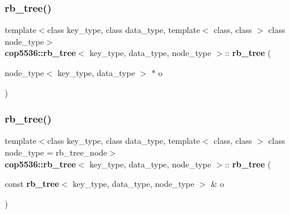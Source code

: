 \mbox{\label{classcop5536_1_1rb__tree_a83cacee524e3d572a88bfc096e32b59d}} 
\subsubsection{rb\_tree()\hspace{0.1cm}{\footnotesize\ttfamily [2/3]}}
{\footnotesize\ttfamily template$<$class key\+\_\+type, class data\+\_\+type, template$<$ class, class $>$ class node\+\_\+type$>$ \\
\textbf{ cop5536\+::rb\+\_\+tree}$<$ key\+\_\+type, data\+\_\+type, node\+\_\+type $>$\+::\textbf{ rb\+\_\+tree} (\begin{DoxyParamCaption}\item[{node\+\_\+type$<$ key\+\_\+type, data\+\_\+type $>$ $\ast$}]{o }\end{DoxyParamCaption})\hspace{0.3cm}{\ttfamily [explicit]}}

\mbox{\label{classcop5536_1_1rb__tree_a35e4d3f5788351f4d7d4086bfb8f31d2}} 
\subsubsection{rb\_tree()\hspace{0.1cm}{\footnotesize\ttfamily [3/3]}}
{\footnotesize\ttfamily template$<$class key\+\_\+type, class data\+\_\+type, template$<$ class, class $>$ class node\+\_\+type = rb\+\_\+tree\+\_\+node$>$ \\
\textbf{ cop5536\+::rb\+\_\+tree}$<$ key\+\_\+type, data\+\_\+type, node\+\_\+type $>$\+::\textbf{ rb\+\_\+tree} (\begin{DoxyParamCaption}\item[{const \textbf{ rb\+\_\+tree}$<$ key\+\_\+type, data\+\_\+type, node\+\_\+type $>$ \&}]{o }\end{DoxyParamCaption})\hspace{0.3cm}{\ttfamily [inline]}}

